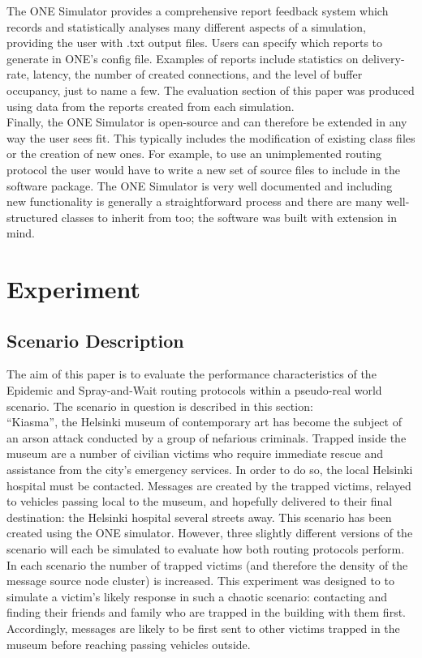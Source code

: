 \documentclass{article}
\begin{document}
\noindent The ONE Simulator provides a comprehensive report feedback system which records and statistically analyses many different aspects of a simulation, providing the user with .txt output files. Users can specify which reports to generate in ONE's config file. Examples of reports include statistics on delivery-rate, latency, the number of created connections, and the level of buffer occupancy, just to name a few. The evaluation section of this paper was produced using data from the reports created from each simulation.\\
\newline Finally, the ONE Simulator is open-source and can therefore be extended in any way the user sees fit. This typically includes the modification of existing class files or the creation of new ones. For example, to use an unimplemented routing protocol the user would have to write a new set of source files to include in the software package. The ONE Simulator is very well documented and including new functionality is generally a straightforward process and there are many well-structured classes to inherit from too; the software was built with extension in mind.\\

\section{Experiment}
\subsection{Scenario Description}
The aim of this paper is to evaluate the performance characteristics of the Epidemic and Spray-and-Wait routing protocols within a pseudo-real world scenario. The scenario in question is described in this section:\\
\newline ``Kiasma'', the Helsinki museum of contemporary art has become the subject of an arson attack conducted by a group of nefarious criminals. Trapped inside the museum are a number of civilian victims who require immediate rescue and assistance from the city's emergency services. In order to do so, the local Helsinki hospital must be contacted. Messages are created by the trapped victims, relayed to vehicles passing local to the museum, and hopefully delivered to their final destination: the Helsinki hospital several streets away.
This scenario has been created using the ONE simulator. However, three slightly different versions of the scenario will each be simulated to evaluate how both routing protocols perform. In each scenario the number of trapped victims (and therefore the density of the message source node cluster) is increased. This experiment was designed to to simulate a victim's likely response in such a chaotic scenario: contacting and finding their friends and family who are trapped in the building with them first. Accordingly, messages are likely to be first sent to other victims trapped in the museum before reaching passing vehicles outside.
\end{document}
